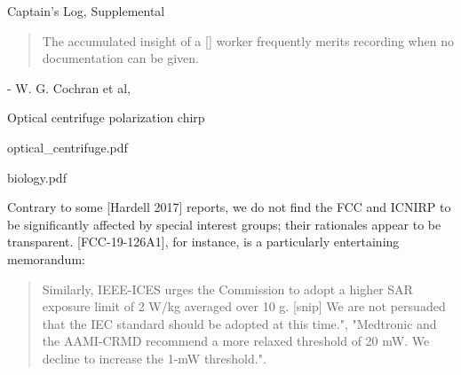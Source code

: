 \documentclass[paper.tex]{subfiles}
\begin{document}
\clearpage
{\Huge Captain's Log, Supplemental}\\

\begin{quote}
The accumulated insight of a [] worker frequently merits recording when no documentation can be given.
\end{quote}

- W. G. Cochran et al, \cite{Statistical1953}





\clearpage
{\Large Optical centrifuge polarization chirp}\\
\begin{multicols}{1}



{optical_centrifuge.pdf}




{biology.pdf}


\end{multicols}



Contrary to some [Hardell 2017] reports, we do not find the FCC and ICNIRP to be significantly affected by special interest groups; their rationales appear to be transparent.  [FCC-19-126A1], for instance, is a particularly entertaining memorandum:

\begin{quote} 
Similarly, IEEE-ICES urges the Commission to adopt a higher SAR exposure limit of 2 W/kg averaged over 10 g. [snip] We are not persuaded that the IEC standard should be adopted at this time.", "Medtronic and the AAMI-CRMD recommend a more relaxed threshold of 20 mW. We decline to increase the 1-mW threshold.". 

\end{quote}
\end{document}
